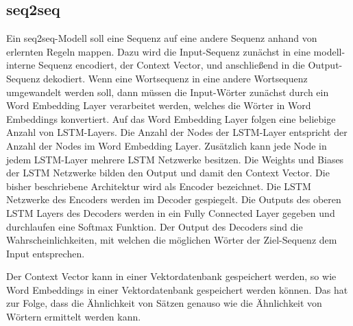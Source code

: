 \subsection{seq2seq}
Ein seq2seq-Modell soll eine Sequenz auf eine andere Sequenz anhand von erlernten Regeln mappen.
Dazu wird die Input-Sequenz zunächst in eine modell-interne Sequenz encodiert, der Context Vector, und anschließend in die Output-Sequenz dekodiert.
Wenn eine Wortsequenz in eine andere Wortsequenz umgewandelt werden soll, dann müssen die Input-Wörter zunächst durch ein Word Embedding Layer verarbeitet werden, welches die Wörter in Word Embeddings konvertiert.
Auf das Word Embedding Layer folgen eine beliebige Anzahl von LSTM-Layers.
Die Anzahl der Nodes der LSTM-Layer entspricht der Anzahl der Nodes im Word Embedding Layer.
Zusätzlich kann jede Node in jedem LSTM-Layer mehrere LSTM Netzwerke besitzen.
Die Weights und Biases der LSTM Netzwerke bilden den Output und damit den Context Vector.
Die bisher beschriebene Architektur wird als Encoder bezeichnet.
Die LSTM Netzwerke des Encoders werden im Decoder gespiegelt.
Die Outputs des oberen LSTM Layers des Decoders werden in ein Fully Connected Layer gegeben und durchlaufen eine Softmax Funktion.
Der Output des Decoders sind die Wahrscheinlichkeiten, mit welchen die möglichen Wörter der Ziel-Sequenz dem Input entsprechen. 

Der Context Vector kann in einer Vektordatenbank gespeichert werden, so wie Word Embeddings in einer Vektordatenbank gespeichert werden können.
Das hat zur Folge, dass die Ähnlichkeit von Sätzen genauso wie die Ähnlichkeit von Wörtern ermittelt werden kann.

